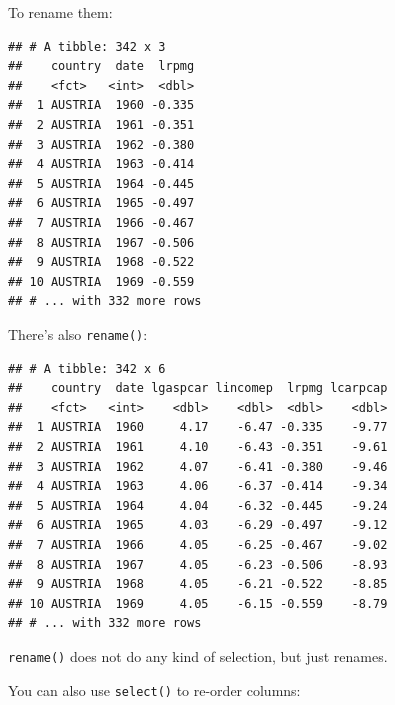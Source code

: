 \documentclass[]{gitbook}
\newenvironment{Shaded}{\begin{snugshade}}{\end{snugshade}}
\newcommand{\DataTypeTok}[1]{\textcolor[rgb]{0.13,0.29,0.53}{#1}}
\newcommand{\KeywordTok}[1]{\textcolor[rgb]{0.13,0.29,0.53}{\textbf{#1}}}
\newcommand{\NormalTok}[1]{#1}
\newcommand{\OperatorTok}[1]{\textcolor[rgb]{0.81,0.36,0.00}{\textbf{#1}}}
\newcommand{\StringTok}[1]{\textcolor[rgb]{0.31,0.60,0.02}{#1}}
\begin{document}
To rename them:

\begin{Shaded}
\end{Shaded}

\begin{verbatim}
## # A tibble: 342 x 3
##    country  date  lrpmg
##    <fct>   <int>  <dbl>
##  1 AUSTRIA  1960 -0.335
##  2 AUSTRIA  1961 -0.351
##  3 AUSTRIA  1962 -0.380
##  4 AUSTRIA  1963 -0.414
##  5 AUSTRIA  1964 -0.445
##  6 AUSTRIA  1965 -0.497
##  7 AUSTRIA  1966 -0.467
##  8 AUSTRIA  1967 -0.506
##  9 AUSTRIA  1968 -0.522
## 10 AUSTRIA  1969 -0.559
## # ... with 332 more rows
\end{verbatim}

There's also \texttt{rename()}:

\begin{Shaded}
\end{Shaded}

\begin{verbatim}
## # A tibble: 342 x 6
##    country  date lgaspcar lincomep  lrpmg lcarpcap
##    <fct>   <int>    <dbl>    <dbl>  <dbl>    <dbl>
##  1 AUSTRIA  1960     4.17    -6.47 -0.335    -9.77
##  2 AUSTRIA  1961     4.10    -6.43 -0.351    -9.61
##  3 AUSTRIA  1962     4.07    -6.41 -0.380    -9.46
##  4 AUSTRIA  1963     4.06    -6.37 -0.414    -9.34
##  5 AUSTRIA  1964     4.04    -6.32 -0.445    -9.24
##  6 AUSTRIA  1965     4.03    -6.29 -0.497    -9.12
##  7 AUSTRIA  1966     4.05    -6.25 -0.467    -9.02
##  8 AUSTRIA  1967     4.05    -6.23 -0.506    -8.93
##  9 AUSTRIA  1968     4.05    -6.21 -0.522    -8.85
## 10 AUSTRIA  1969     4.05    -6.15 -0.559    -8.79
## # ... with 332 more rows
\end{verbatim}

\texttt{rename()} does not do any kind of selection, but just renames.

You can also use \texttt{select()} to re-order columns:

\begin{Shaded}
\end{Shaded}
\end{document}
